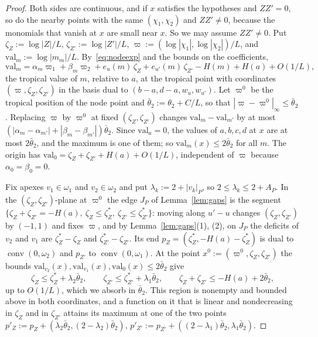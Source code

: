 \begin{proof}
Both sides are continuous, and if $x$ satisfies the hypotheses and $ZZ'=0$, so do the nearby points with the same
$(\chi_1,\chi_2)$ and $ZZ'\ne0$, because the monomials that vanish at $x$ are small near $x$. So we may assume
$ZZ'\neq0$. Put $\zeta_Z:=\log|Z|/L$, $\zeta_{Z'}:=\log|Z'|/L$, $\varpi:=(\log|\chi_1|,\log|\chi_2|)/L$, and
$\mathrm{val}_m:=\log|m_m|/L$. By~\eqref{eq:nodeexp} and the bounds on the coefficients,
\[
\mathrm{val}_m=\alpha_m\varpi_1+\beta_m\varpi_2+e_u(m)\,\zeta_Z+e_{u'}(m)\,\zeta_{Z'}-H(m)+H(a)+O(1/L),
\]
the tropical value of $m$, relative to $a$, at the tropical point with coordinates $(\varpi,\zeta_Z,\zeta_{Z'})$ in the basis
dual to $(b-a,d-a,w_u,w_{u'})$. Let $\varpi^0$ be the tropical position of the node point and
$\bar\theta_2:=\theta_2+C/L$, so that $|\varpi-\varpi^0|_\infty\le\bar\theta_2$. Replacing $\varpi$ by $\varpi^0$ at fixed
$(\zeta_Z,\zeta_{Z'})$ changes $\mathrm{val}_m-\mathrm{val}_{m'}$ by at most $(|\alpha_m-\alpha_{m'}|+|\beta_m-\beta_{m'}|)\bar\theta_2$.
Since $\mathrm{val}_a=0$, the values of $a,b,c,d$ at $x$ are at most $2\bar\theta_2$, and the maximum is one of them; so
$\mathrm{val}_m(x)\le2\bar\theta_2$ for all $m$. The origin has $\mathrm{val}_0=\zeta_Z+\zeta_{Z'}+H(a)+O(1/L)$, independent of
$\varpi$ because $\alpha_0=\beta_0=0$.

Fix apexes $v_1\in\omega_1$ and $v_2\in\omega_2$ and put $\lambda_k:=2+|v_k|_P$, so $2\le\lambda_k\le2+A_P$. In the
$(\zeta_Z,\zeta_{Z'})$-plane at $\varpi^0$ the edge $J_P$ of Lemma~\ref{lem:gaps} is the segment
$\{\zeta_Z+\zeta_{Z'}=-H(a),\ \zeta_Z\le\zeta^*_Z,\ \zeta_{Z'}\le\zeta^*_{Z'}\}$: moving along $u'-u$ changes $(\zeta_Z,\zeta_{Z'})$
by $(-1,1)$ and fixes $\varpi$, and by Lemma~\ref{lem:gaps}(1), (2), on $J_P$ the deficits of $v_2$ and $v_1$ are
$\zeta^*_Z-\zeta_Z$ and $\zeta^*_{Z'}-\zeta_{Z'}$. Its end $p_Z=(\zeta^*_Z,-H(a)-\zeta^*_Z)$ is dual to
$\operatorname{conv}(0,\omega_2)$ and $p_{Z'}$ to $\operatorname{conv}(0,\omega_1)$. At the point
$x^0:=(\varpi^0,\zeta_Z,\zeta_{Z'})$ the bounds $\mathrm{val}_{v_2}(x),\mathrm{val}_{v_1}(x),\mathrm{val}_0(x)\le2\bar\theta_2$ give
\[
\zeta_Z\le\zeta^*_Z+\lambda_2\bar\theta_2,\qquad \zeta_{Z'}\le\zeta^*_{Z'}+\lambda_1\bar\theta_2,\qquad
\zeta_Z+\zeta_{Z'}\le-H(a)+2\bar\theta_2,
\]
up to $O(1/L)$, which we absorb in $\bar\theta_2$. This region is nonempty and bounded above in both coordinates, and a
function on it that is linear and nondecreasing in $\zeta_Z$ and in $\zeta_{Z'}$ attains its maximum at one of the two
points $p'_Z:=p_Z+(\lambda_2\bar\theta_2,(2-\lambda_2)\bar\theta_2)$, $p'_{Z'}:=p_{Z'}+((2-\lambda_1)\bar\theta_2,\lambda_1\bar\theta_2)$.


\end{proof}
